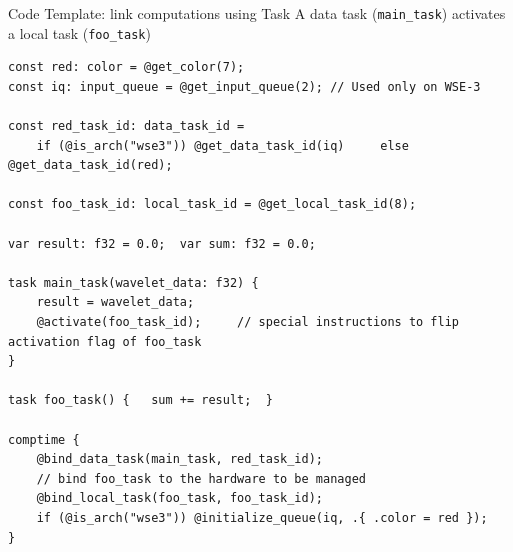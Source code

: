 \documentclass[dvipdfmx, 11pt, aspectratio=169]{beamer}   %
\begin{document}
\begin{frame}[fragile]{Code Template: link computations using Task}
A data task (\lstinline|main_task|) activates a local task (\lstinline|foo_task|)
\begin{lstlisting}[language=CSL, basicstyle=\ttfamily\tiny]
const red: color = @get_color(7);
const iq: input_queue = @get_input_queue(2); // Used only on WSE-3

const red_task_id: data_task_id =
    if (@is_arch("wse3")) @get_data_task_id(iq)     else    @get_data_task_id(red);

const foo_task_id: local_task_id = @get_local_task_id(8);

var result: f32 = 0.0;  var sum: f32 = 0.0;

task main_task(wavelet_data: f32) {
    result = wavelet_data;
    @activate(foo_task_id);     // special instructions to flip activation flag of foo_task
}

task foo_task() {   sum += result;  }

comptime {
    @bind_data_task(main_task, red_task_id);
    // bind foo_task to the hardware to be managed 
    @bind_local_task(foo_task, foo_task_id);
    if (@is_arch("wse3")) @initialize_queue(iq, .{ .color = red });
}
\end{lstlisting}
\end{frame}
\end{document}
